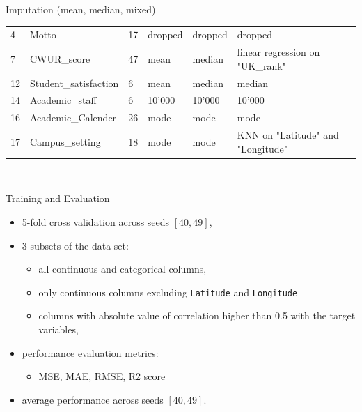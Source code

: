 \documentclass[xcolor=table]{beamer} %
\begin{document}
\begin{frame}{Imputation (mean, median, mixed)}
\begin{itemize}
\begin{table}[h]
\begin{tabular}{l|l|lBl|l|l}
        4   & Motto                 & 17  & dropped & dropped & dropped \\
        7   & CWUR\_score           & 47  & mean    & median  & linear regression on "UK\_rank" \\
        12  & Student\_satisfaction & 6   & mean    & median  & median \\
        14  & Academic\_staff       & 6   & 10'000  & 10'000  & 10'000 \\
        16  & Academic\_Calender    & 26  & mode    & mode    & mode\\
        17  & Campus\_setting       & 18  & mode    & mode    & KNN on "Latitude" and "Longitude"
      \end{tabular}\hfill\
      \label{tab:missing_values_nan}
    \end{table}
  \end{itemize}
\end{frame}

\begin{frame}{Training and Evaluation}
  \vspace{-1cm}
  \begin{itemize}
      \item 5-fold cross validation across seeds $[40, 49]$,
      \item 3 subsets of the data set:
        \begin{itemize}
        	\footnotesize
            \item all continuous and categorical columns,
            \item only continuous columns excluding \texttt{Latitude} and \texttt{Longitude}
            \item columns with absolute value of correlation higher than 0.5 with the target variables,
        \end{itemize}
      \item performance evaluation metrics:
      	\begin{itemize}
      		\footnotesize
      		\item MSE, MAE, RMSE, R2 score
		\end{itemize}       
      \item average performance across seeds $[40, 49]$.
  \end{itemize}
\end{frame}
\end{document}
